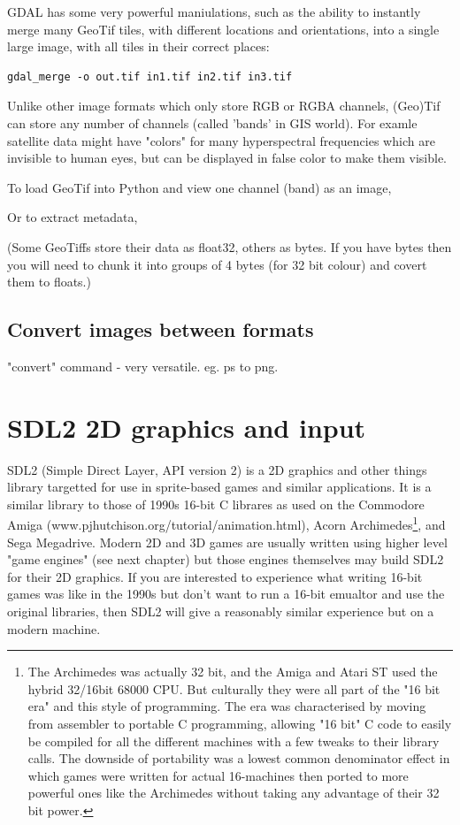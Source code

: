 \documentclass[oneside,english]{scrbook}
\begin{document}
GDAL has some very powerful maniulations, such as the ability to instantly merge many GeoTif tiles, with different locations and orientations, into a single large image, with all tiles in their correct places:
\begin{lstlisting}
gdal_merge -o out.tif in1.tif in2.tif in3.tif
\end{lstlisting}

Unlike other image formats which only store RGB or RGBA channels, (Geo)Tif can store any number of channels (called 'bands' in GIS world). For examle satellite data might have "colors" for many hyperspectral frequencies which are invisible to human eyes, but can be displayed in false color to make them visible.

To load GeoTif into Python and view one channel (band) as an image,


Or to extract metadata,


(Some GeoTiffs store their data as float32, others as bytes. If you have bytes then you will need to chunk it into groups of 4 bytes (for 32 bit colour) and covert them to floats.)

\section{Convert images between formats}
"convert" command - very versatile. eg. ps to png.


\chapter{SDL2 2D graphics and input}

SDL2 (Simple Direct Layer, API version 2) is a 2D graphics and other things library targetted for use in sprite-based games and similar applications.  It is a similar library to those of 1990s 16-bit C librares as used on the Commodore Amiga (www.pjhutchison.org/tutorial/animation.html), Acorn Archimedes\footnote{The Archimedes was actually 32 bit, and the Amiga and Atari ST used the hybrid 32/16bit 68000 CPU. But culturally they were all part of the "16 bit era" and this style of programming.  The era was characterised by moving from assembler to portable C programming, allowing "16 bit" C code to easily be compiled for all the different machines with a few tweaks to their library calls.  The downside of portability was a lowest common denominator effect in which games were written for actual 16-machines then ported to more powerful ones like the Archimedes without taking any advantage of their 32 bit power. }, and Sega Megadrive.  Modern 2D and 3D games are usually written using higher level "game engines" (see next chapter) but those engines themselves may build SDL2 for their 2D graphics.  If you are interested to experience what writing 16-bit games was like in the 1990s but don't want to run a 16-bit emualtor and use the original libraries, then SDL2 will give a reasonably similar experience but on a modern machine. 
\end{document}

